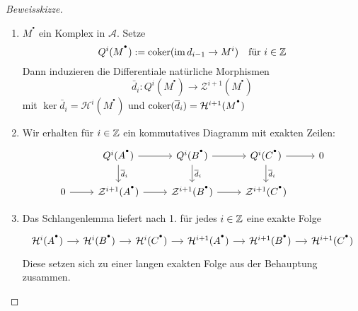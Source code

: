 \begin{proof}[Beweisskizze]
	\begin{enumerate}
		\item $M^{^\bullet}$ ein Komplex in $\mathcal{A}$. Setze 
		$$Q^i(M^{^\bullet}) := \operatorname{coker}( \operatorname{im} d_{i-1} \to M^i) \quad \text{für } i\in \mathbb{Z}$$
		Dann induzieren die Differentiale natürliche Morphismen 
		$$\bar{d}_i: Q^i(M^{^\bullet}) \longrightarrow \mathcal{Z}^{i+1}(M^{^\bullet})$$
		mit $\ker \bar{d}_i = \mathcal{H}^i(M^{^\bullet})$ und $\operatorname{coker}(\overline{d}_i) = \mathcal{H}^{i+1}(M^{^\bullet})$
		\item Wir erhalten für $i\in \mathbb{Z}$ ein kommutatives Diagramm mit exakten Zeilen:
		$$\begin{tikzcd}
		& Q^i(A^{^\bullet}) \arrow{r}\arrow{d}{\bar{d}_i} & Q^i(B^{^\bullet}) \arrow{r}\arrow{d}{\bar{d}_i} & Q^i(C^{^\bullet}) \arrow{r}\arrow{d}{\bar{d}_i} & 0\\
		0 \arrow{r} & \mathcal{Z}^{i+1}(A^{^\bullet}) \arrow{r}  & \mathcal{Z}^{i+1}(B^{^\bullet})  \arrow{r} & \mathcal{Z}^{i+1}(C^{^\bullet}) &
		\end{tikzcd} $$
		\item Das Schlangenlemma liefert nach 1. für jedes $i\in \mathbb{Z}$ eine exakte Folge 
			$$\begin{tikzcd}[column sep = small]
		 \mathcal{H}^i(A^{^\bullet}) \arrow{r} & \mathcal{H}^i(B^{^\bullet}) \arrow{r} & \mathcal{H}^i(C^{^\bullet}) \arrow{r} & \mathcal{H}^{i+1}(A^{^\bullet}) \arrow{r}& \mathcal{H}^{i+1}(B^{^\bullet}) \arrow{r} & \mathcal{H}^{i+1}(C^{^\bullet})
		\end{tikzcd}$$
		Diese setzen sich zu einer langen exakten Folge aus der Behauptung zusammen.
	\end{enumerate}
\end{proof}
